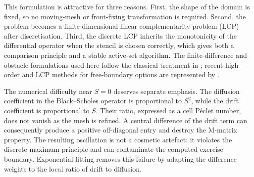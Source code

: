 \documentclass[11pt,a4paper]{article}
\theoremstyle{definition}
\theoremstyle{remark}
\begin{document}
This formulation is attractive for three reasons. First, the shape of the
domain is fixed, so no moving-mesh or front-fixing transformation is required.
Second, the problem becomes a finite-dimensional linear complementarity
problem (LCP) after discretisation. Third, the discrete LCP inherits the
monotonicity of the differential operator when the stencil is chosen
correctly, which gives both a comparison principle and a stable active-set
algorithm. The finite-difference and obstacle formulations used here follow
the classical treatment in \cite{ref2}; recent high-order and LCP methods for
free-boundary options are represented by \cite{ref3,ref9}.

The numerical difficulty near $S=0$ deserves separate emphasis. The diffusion
coefficient in the Black--Scholes operator is proportional to $S^2$, while
the drift coefficient is proportional to $S$. Their ratio, expressed as a
cell P\'eclet number, does not vanish as the mesh is refined. A central
difference of the drift term can consequently produce a positive
off-diagonal entry and destroy the M-matrix property. The resulting
oscillation is not a cosmetic artefact: it violates the discrete maximum
principle and can contaminate the computed exercise boundary. Exponential
fitting removes this failure by adapting the difference weights to the local
ratio of drift to diffusion.
\end{document}
